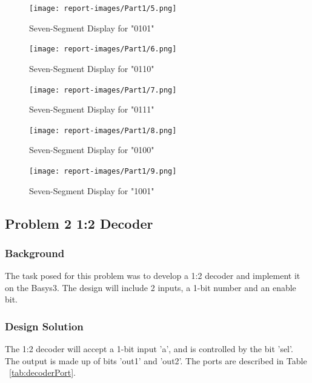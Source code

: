\documentclass[11pt]{article}
\begin{document}
\begin{figure}[H]
\begin{center}
\texttt{[image: report-images/Part1/5.png]}
\caption{Seven-Segment Display for "0101"}
\label{fig:sevenSegFive}
\end{center}
\end{figure}

\begin{figure}[H]
\begin{center}
\texttt{[image: report-images/Part1/6.png]}
\caption{Seven-Segment Display for "0110"}
\label{fig:sevenSegSix}
\end{center}
\end{figure}

\begin{figure}[H]
\begin{center}
\texttt{[image: report-images/Part1/7.png]}
\caption{Seven-Segment Display for "0111"}
\label{fig:sevenSegSeven}
\end{center}
\end{figure}

\begin{figure}[H]
\begin{center}
\texttt{[image: report-images/Part1/8.png]}
\caption{Seven-Segment Display for "0100"}
\label{fig:sevenSegEight}
\end{center}
\end{figure}

\begin{figure}[H]
\begin{center}
\texttt{[image: report-images/Part1/9.png]}
\caption{\label{fig: fig-name} Seven-Segment Display for "1001"}
\label{fig:sevenSegNine}
\end{center}
\end{figure}

\pagebreak

\subsection{Problem 2 1:2 Decoder}

\subsubsection{Background}
The task posed for this problem was to develop a 1:2 decoder and implement it on the Basys3. The design will include 2 inputs, a 1-bit number and an enable bit.

\subsubsection{Design Solution}
The 1:2 decoder will accept a 1-bit input 'a', and is controlled by the bit 'sel'. The output is made up of bits 'out1' and 'out2'. The ports are described in Table ~\ref{tab:decoderPort}.
\end{document}
